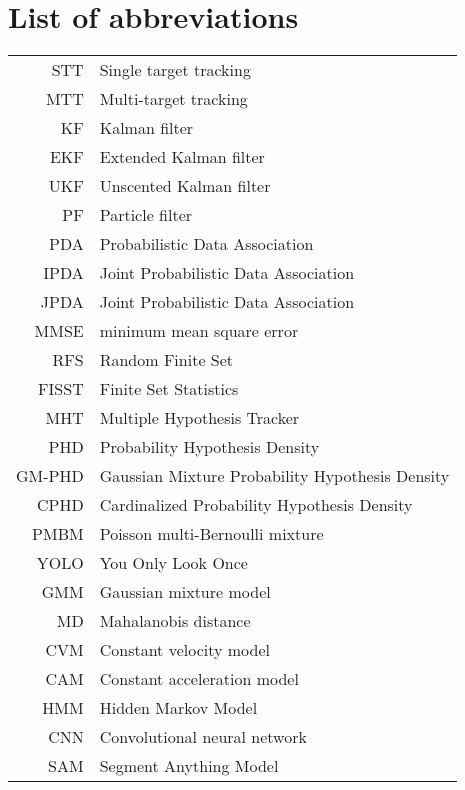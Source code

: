 \documentclass[english,master,unicode,oneside]{ctufit-thesis.c}
\theoremstyle{plain}
\theoremstyle{definition}
\theoremstyle{remark}
\theoremstyle{definition}
\numberwithin{theorem}{chapter}
\begin{document}
\chapter{List of abbreviations}
	
\begin{tabular}{rl}
  STT & Single target tracking \\
MTT & Multi-target tracking \\
KF & Kalman filter \\
EKF & Extended Kalman filter \\
UKF & Unscented Kalman filter \\
PF & Particle filter \\
PDA  & Probabilistic Data Association \\
IPDA & Joint Probabilistic Data Association\\
JPDA  & Joint Probabilistic Data Association \\
MMSE & minimum mean square error \\
RFS & Random Finite Set \\
  FISST & Finite Set Statistics \\
MHT &   Multiple Hypothesis Tracker \\
PHD & Probability Hypothesis Density \\
  GM-PHD & Gaussian Mixture Probability Hypothesis Density \\
CPHD & Cardinalized Probability Hypothesis Density \\
PMBM & Poisson multi-Bernoulli mixture \\
YOLO & You Only Look Once \\
GMM & Gaussian mixture model \\
  MD & Mahalanobis distance \\
CVM & Constant velocity model \\
CAM & Constant acceleration model \\
HMM & Hidden Markov Model \\
  CNN & Convolutional neural network \\
  SAM &Segment Anything Model \\
\end{tabular}

\mainmatter\mainmatterinit %
\end{document}

